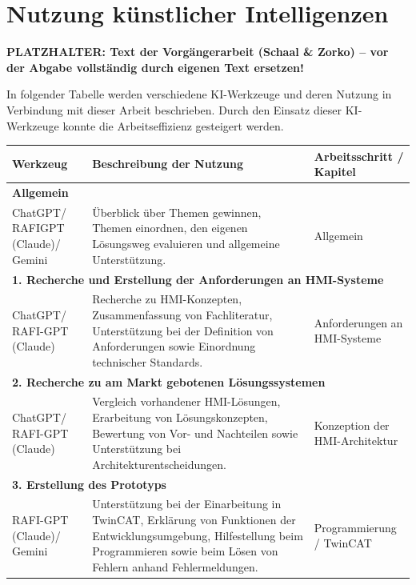 \section*{Nutzung künstlicher Intelligenzen}

\noindent\colorbox{red!15}{\parbox{\dimexpr\textwidth-2\fboxsep}{\textbf{\color{red}PLATZHALTER: Text der Vorgängerarbeit (Schaal \& Zorko) – vor der Abgabe vollständig durch eigenen Text ersetzen!}}}

In folgender Tabelle werden verschiedene KI-Werkzeuge und deren Nutzung in Verbindung mit dieser Arbeit beschrieben. Durch den Einsatz dieser KI-Werkzeuge konnte die Arbeitseffizienz gesteigert werden.

\begin{tabular}{|p{2.2cm}|p{9.5cm}|p{3.5cm}|}
  \hline
  \textbf{Werkzeug} & \textbf{Beschreibung der Nutzung} & \textbf{Arbeitsschritt / Kapitel} \\
  \hline
  \multicolumn{3}{|l|}{\textbf{Allgemein}} \\
  \hline
  ChatGPT/ RAFIGPT (Claude)/ Gemini & Überblick über Themen gewinnen, Themen einordnen, den eigenen Lösungsweg evaluieren und allgemeine Unterstützung. & Allgemein \\
  \hline
  \multicolumn{3}{|l|}{\textbf{1. Recherche und Erstellung der Anforderungen an HMI-Systeme}} \\
  \hline
  ChatGPT/ RAFI-GPT (Claude) &
  Recherche zu HMI-Konzepten, Zusammenfassung von Fachliteratur, Unterstützung bei der Definition von Anforderungen sowie Einordnung technischer Standards. &
  Anforderungen an HMI-Systeme \\
  \hline
  \multicolumn{3}{|l|}{\textbf{2. Recherche zu am Markt gebotenen Lösungssystemen}} \\
  \hline
  ChatGPT/ RAFI-GPT (Claude) &
  Vergleich vorhandener HMI-Lösungen, Erarbeitung von Lösungskonzepten, Bewertung von Vor- und Nachteilen sowie Unterstützung bei Architekturentscheidungen. &
  Konzeption der HMI-Architektur \\
  \hline
  \multicolumn{3}{|l|}{\textbf{3. Erstellung des Prototyps}} \\
  \hline
  RAFI-GPT (Claude)/ Gemini &
  Unterstützung bei der Einarbeitung in TwinCAT, Erklärung von Funktionen der Entwicklungsumgebung, Hilfestellung beim Programmieren sowie beim Lösen von Fehlern anhand Fehlermeldungen. &
  Programmierung / TwinCAT \\

\end{tabular}
